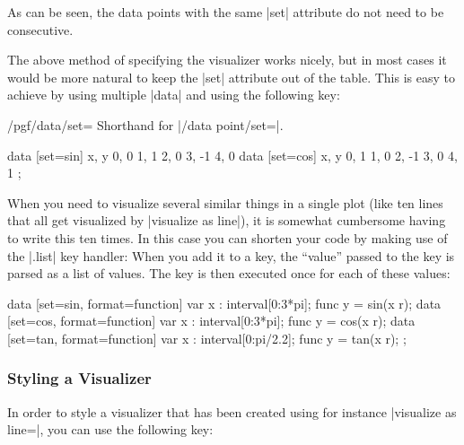 As can be seen, the data points with the same |set| attribute do not need to be
consecutive.

The above method of specifying the visualizer works nicely, but in most cases
it would be more natural to keep the |set| attribute out of the table. This is
easy to achieve by using multiple |data| and using the following key:

\begin{key}{/pgf/data/set=}
    Shorthand for |/data point/set=|.
\begin{codeexample}[width=7cm,preamble={\usetikzlibrary{datavisualization}}]
\tikz \datavisualization
 [scientific axes=clean,
  visualize as line=sin,
  visualize as line=cos]
data [set=sin] {
  x, y
  0, 0
  1, 1
  2, 0
  3, -1
  4, 0
}
data [set=cos] {
  x, y
  0, 1
  1, 0
  2, -1
  3, 0
  4, 1
};
\end{codeexample}
\end{key}

When you need to visualize several similar things in a single plot (like ten
lines that all get visualized by |visualize as line|), it is somewhat
cumbersome having to write this ten times. In this case you can shorten your
code by making use of the |.list| key handler: When you add it to a key, the
``value'' passed to the key is parsed as a list of values. The key is then
executed once for each of these values:
%
\begin{codeexample}[
    width=7cm,
    preamble={\usetikzlibrary{datavisualization.formats.functions}},
]
\tikz \datavisualization
 [scientific axes=clean,
  visualize as line/.list={sin, cos, tan}]
data [set=sin, format=function] {
  var x : interval[0:3*pi];
  func y = sin(\value x r);
}
data [set=cos, format=function] {
  var x : interval[0:3*pi];
  func y = cos(\value x r);
}
data [set=tan, format=function] {
  var x : interval[0:pi/2.2];
  func y = tan(\value x r);
};
\end{codeexample}


\subsubsection{Styling a Visualizer}
\label{section-dv-visualizer-styling}

In order to style a visualizer that has been created using for instance
|visualize as line=|, you can use the following key:


